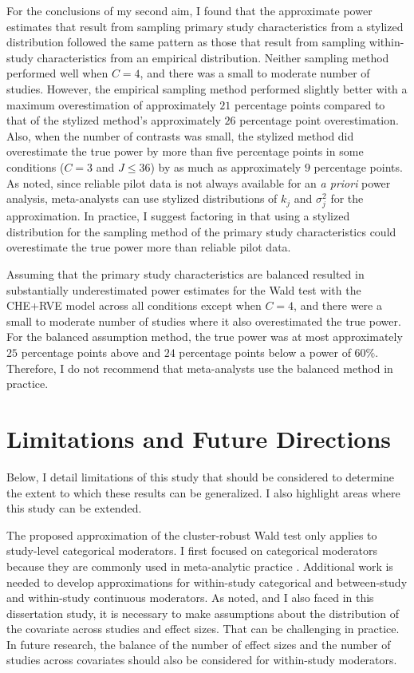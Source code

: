 For the conclusions of my second aim, I found that the approximate power estimates that result from sampling primary study characteristics from a stylized distribution followed the same pattern as those that result from sampling within-study characteristics from an empirical distribution. Neither sampling method performed well when $C=4$, and there was a small to moderate number of studies. However, the empirical sampling method performed slightly better with a maximum overestimation of approximately $21$ percentage points compared to that of the stylized method's approximately $26$ percentage point overestimation. Also, when the number of contrasts was small, the stylized method did overestimate the true power by more than five percentage points in some conditions ($C = 3$ and $J \leq 36$) by as much as approximately $9$ percentage points. As \textcite{vembye2023} noted, since reliable pilot data is not always available for an \textit{a priori} power analysis, meta-analysts can use stylized distributions of $k_j$ and $\sigma_j^2$ for the approximation. In practice, I suggest factoring in that using a stylized distribution for the sampling method of the primary study characteristics could overestimate the true power more than reliable pilot data. 

Assuming that the primary study characteristics are balanced resulted in substantially underestimated power estimates for the Wald test with the CHE+RVE model across all conditions except when $C=4$, and there were a small to moderate number of studies where it also overestimated the true power. For the balanced assumption method, the true power was at most approximately $25$ percentage points above and $24$ percentage points below a power of $60\%$.  Therefore, I do not recommend that meta-analysts use the balanced method in practice. 

\section{Limitations and Future Directions}

Below, I detail limitations of this study that should be considered to determine the extent to which these results can be generalized. I also highlight areas where this study can be extended. 

The proposed approximation of the cluster-robust Wald test only applies to study-level categorical moderators. I first focused on categorical moderators because they are commonly used in meta-analytic practice \autocite{ahn2012, tipton2019}. Additional work is needed to develop approximations for within-study categorical and between-study and within-study continuous moderators. As \textcite{vembye2023} noted, and I also faced in this dissertation study, it is necessary to make assumptions about the distribution of the covariate across studies and effect sizes. That can be challenging in practice. In future research, the balance of the number of effect sizes and the number of studies across covariates should also be considered for within-study moderators.  

